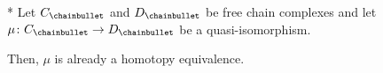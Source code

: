 \begin{lemma}*
  \label{lm:quasi-isomorphism-of-free-chain-complexes-is-homotopy-equivalence}
  Let $C_\chainbullet $ and $D_\chainbullet $ be free chain complexes
  and let $\mu\colon C_\chainbullet \to D_\chainbullet $
  be a quasi-isomorphism.

  Then, $\mu$ is already a homotopy equivalence.
\end{lemma}
